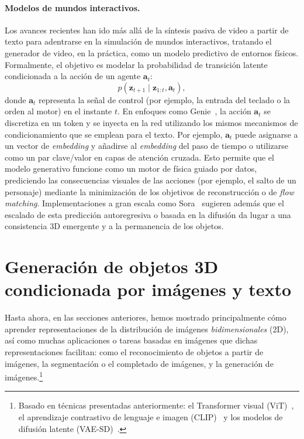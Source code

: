 \documentclass[../../book-main_es.tex]{subfiles}
\begin{document}
\paragraph{Modelos de mundos interactivos.}
Los avances recientes han ido más allá de la síntesis pasiva de video a partir de texto para adentrarse 
en la simulación de mundos interactivos, tratando el generador de video, en la práctica, como 
un modelo predictivo de entornos físicos. Formalmente, el objetivo es modelar la probabilidad 
de transición latente condicionada a la acción de un agente $\boldsymbol{a}_t$:
\begin{equation}
    p(\boldsymbol{z}_{t+1} \mid \boldsymbol{z}_{1:t}, \boldsymbol{a}_t),
\end{equation}
donde $\boldsymbol{a}_t$ representa la señal de control (por ejemplo, la entrada del teclado o 
la orden al motor) en el instante $t$. En enfoques como Genie~\citep{bruce2024genie}, la acción 
$\boldsymbol{a}_t$ se discretiza en un token y se inyecta en la red utilizando los mismos 
mecanismos de condicionamiento que se emplean para el texto. Por ejemplo, $\boldsymbol{a}_t$ 
puede asignarse a un vector de \textit{embedding} y añadirse al \textit{embedding} del paso de tiempo o 
utilizarse como un par clave/valor en capas de atención cruzada. Esto permite que el modelo 
generativo funcione como un motor de física guiado por datos, prediciendo las consecuencias 
visuales de las acciones (por ejemplo, el salto de un personaje) mediante la minimización de 
los objetivos de reconstrucción o de \textit{flow matching}. Implementaciones a gran escala 
como Sora~\citep{openai2024sora} sugieren además que el escalado de esta predicción autoregresiva 
o basada en la difusión da lugar a una consistencia 3D emergente y a la permanencia de los objetos.

\section{Generación de objetos 3D condicionada por imágenes y texto}
\label{sec:Michelangelo}\label{sec:object-generation}

Hasta ahora, en las secciones anteriores, hemos mostrado principalmente cómo aprender
representaciones de la distribución de imágenes {\em bidimensionales} (2D),
así como muchas aplicaciones o tareas basadas en imágenes que
dichas representaciones facilitan: como el reconocimiento de objetos a partir de imágenes,
la segmentación o el completado de imágenes, y la
generación de imágenes.\footnote{Basado en técnicas presentadas anteriormente: el
Transformer visual (ViT)~\cite{NIPS2017_3f5ee243}, el aprendizaje
contrastivo de lenguaje e imagen (CLIP)~\cite{pmlr-v139-radford21a} y los modelos de
difusión latente (VAE-SD)~\cite{rombach2022high}.}
\end{document}
